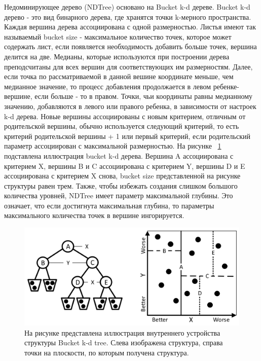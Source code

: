 Недоминирующее дерево (NDTree) основано на Bucket k-d дереве. Bucket k-d дерево - это вид бинарного дерева, где хранятся точки k-мерного пространства. Каждая вершина дерева ассоциирована с одной размерностью. Листья имеют так называемый bucket size - максимальное количество точек, которое может содержать лист, если появляется необходимость добавить больше точек, вершина делится на две. Медианы, которые используются при построении дерева преподсчитаны для всех вершин для соответствующих им размерностям. Далее, если точка по рассматриваемой в данной вешине координате меньше, чем медианное значение, то процесс добавления продолжается в левом ребенке-вершине, если больше - то в правом. Точки, чьи координаты равны медианному значению, добавляются в левого или правого ребенка, в зависимости от настроек k-d дерева. Новые вершины ассоциированы с новым критерием, отличным от родительской вершины, обычно используется следующий критерий, то есть критерий родительской вершины + 1 или первый критерий, если родительский параметр ассоциирован с максимальной размерностью.  На рисунке ~\ref{ndt_explanation} подставлена иллюстрация bucket k-d дерева. Вершина A ассоциирована с критерием X, вершины B и C ассоциирована с критерием Y, вершины D и E ассоциирована с критерием X снова, bucket size представленной на рисунке структуры равен трем. Также, чтобы избежать создания слишком большого количества уровней, NDTree имеет параметр максимальной глубины. Это означает, что если достигнута максимальная глубина, то параметры максимального количества точек в вершине ингорируется.

\begin{figure}[!h]
\begin{center}
\includegraphics[width=15cm]{pic/ndt_explanation.png}
\caption{На рисунке представлена иллюстрация внутреннего устройства структуры Bucket k-d tree. Слева изображена структура, справа точки на плоскости, по которым получена структура.}
\label{ndt_explanation}
\end{center}
\end{figure}

